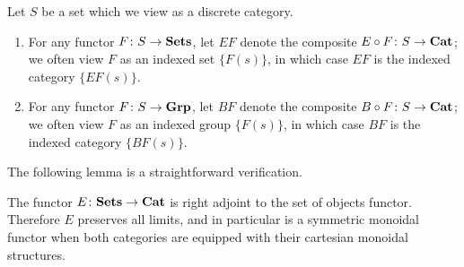 \begin{nota}\label{nota:e_b}
Let $S$ be a set which we view as a discrete category.
  \begin{enumerate}
    \item For any functor $F \colon S \rightarrow \mathbf{Sets}$, let $EF$ denote the composite $E \circ F \colon S \rightarrow \mathbf{Cat}$; we often view $F$ as an indexed set $\{ F(s) \}$, in which case $EF$ is the indexed category $\{ EF(s) \}$.
    \item For any functor $F \colon S \rightarrow \mathbf{Grp}$, let $BF$ denote the composite $B \circ F \colon S \rightarrow \mathbf{Cat}$; we often view $F$ as an indexed group $\{ F(s) \}$, in which case $BF$ is the indexed category $\{ BF(s) \}$.
  \end{enumerate}
\end{nota}

The following lemma is a straightforward verification.

\begin{lem}\label{symmoncor}
The functor $E \colon \mathbf{Sets} \rightarrow \mathbf{Cat}$ is right adjoint to the set of objects functor. Therefore $E$ preserves all limits, and in particular is a symmetric monoidal functor when both categories are equipped with their cartesian monoidal structures.
\end{lem}

